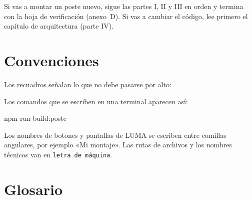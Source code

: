 Si vas a montar un poste nuevo, sigue las partes I, II y III en orden y termina con la hoja de verificación (anexo~D). Si vas a cambiar el código, lee primero el capítulo de arquitectura (parte IV).

\section{Convenciones}

Los recuadros señalan lo que no debe pasarse por alto:




Los comandos que se escriben en una terminal aparecen así:

\begin{comando}
npm run build:poste
\end{comando}

Los nombres de botones y pantallas de LUMA se escriben entre comillas angulares, por ejemplo «Mi montaje». Las rutas de archivos y los nombres técnicos van en \texttt{letra de máquina}.

\section{Glosario}

